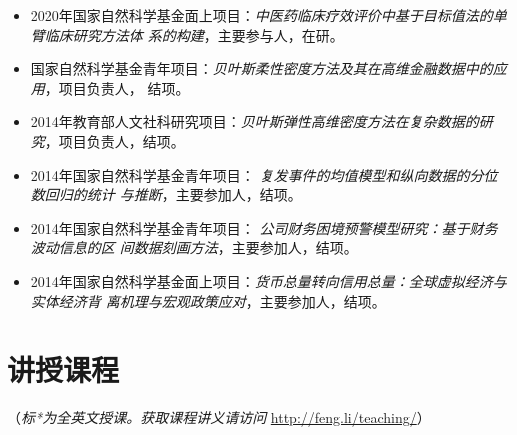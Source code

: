 \documentclass[twoside,a4paper,10pt]{amsart}
\begin{document}
\begin{itemize}

\item 2020年国家自然科学基金面上项目：\emph{中医药临床疗效评价中基于目标值法的单臂临床研究方法体
    系的构建}，主要参与人，在研。

\item 国家自然科学基金青年项目：\emph{贝叶斯柔性密度方法及其在高维金融数据中的应用}，项目负责人，
  结项。

\item 2014年教育部人文社科研究项目：\emph{贝叶斯弹性高维密度方法在复杂数据的研
    究}，项目负责人，结项。

\item 2014年国家自然科学基金青年项目： \emph{复发事件的均值模型和纵向数据的分位数回归的统计
    与推断}，主要参加人，结项。

\item 2014年国家自然科学基金青年项目： \emph{公司财务困境预警模型研究：基于财务波动信息的区
    间数据刻画方法}，主要参加人，结项。

\item 2014年国家自然科学基金面上项目：\emph{货币总量转向信用总量：全球虚拟经济与实体经济背
    离机理与宏观政策应对}，主要参加人，结项。

\end{itemize}

\section*{讲授课程}
（\emph{标*为全英文授课。获取课程讲义请访问} \url{http://feng.li/teaching/}）
\end{document}
